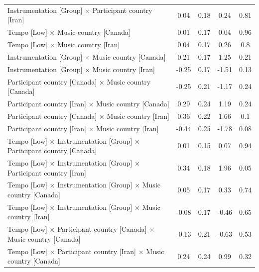 \documentclass[
  bookmarksnumbered]{article}
\begin{document}
\begin{table}[H]
{\begin{tabular}[t]{lcccc}
\hspace{1em}Instrumentation [Group] × Participant country [Iran] & 0.04 & 0.18 & 0.24 & 0.81\\
\hspace{1em}Tempo [Low] × Music country [Canada] & 0.01 & 0.17 & 0.04 & 0.96\\
\hspace{1em}Tempo [Low] × Music country [Iran] & 0.04 & 0.17 & 0.26 & 0.8\\
\hspace{1em}Instrumentation [Group] × Music country [Canada] & 0.21 & 0.17 & 1.25 & 0.21\\
\hspace{1em}Instrumentation [Group] × Music country [Iran] & -0.25 & 0.17 & -1.51 & 0.13\\
\hspace{1em}Participant country [Canada] × Music country [Canada] & -0.25 & 0.21 & -1.17 & 0.24\\
\hspace{1em}Participant country [Iran] × Music country [Canada] & 0.29 & 0.24 & 1.19 & 0.24\\
\hspace{1em}Participant country [Canada] × Music country [Iran] & 0.36 & 0.22 & 1.66 & 0.1\\
\hspace{1em}Participant country [Iran] × Music country [Iran] & -0.44 & 0.25 & -1.78 & 0.08\\
\hspace{1em}Tempo [Low] × Instrumentation [Group] × Participant country [Canada] & 0.01 & 0.15 & 0.07 & 0.94\\
\hspace{1em}Tempo [Low] × Instrumentation [Group] × Participant country [Iran] & 0.34 & 0.18 & 1.96 & 0.05\\
\hspace{1em}Tempo [Low] × Instrumentation [Group] × Music country [Canada] & 0.05 & 0.17 & 0.33 & 0.74\\
\hspace{1em}Tempo [Low] × Instrumentation [Group] × Music country [Iran] & -0.08 & 0.17 & -0.46 & 0.65\\
\hspace{1em}Tempo [Low] × Participant country [Canada] × Music country [Canada] & -0.13 & 0.21 & -0.63 & 0.53\\
\hspace{1em}Tempo [Low] × Participant country [Iran] × Music country [Canada] & 0.24 & 0.24 & 0.99 & 0.32\\

\end{tabular}}
\end{table}
\end{document}
